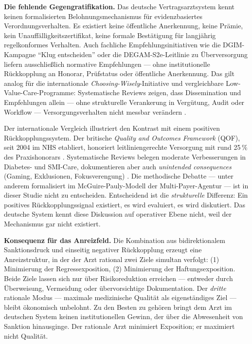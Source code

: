 \documentclass{umbruch-position}
\begin{document}
\textbf{Die fehlende Gegengratifikation.} Das deutsche Vertragsarztsystem kennt keinen formalisierten Belohnungsmechanismus für evidenzbasiertes Verordnungsverhalten. Es existiert keine öffentliche Anerkennung, keine Prämie, kein Unauffälligkeitszertifikat, keine formale Bestätigung für langjährig regelkonformes Verhalten. Auch fachliche Empfehlungsinitiativen wie die DGIM-Kampagne ``Klug entscheiden'' \cite{dgim_klug_entscheiden} oder die DEGAM-S2e-Leitlinie zu Überversorgung \cite{degam_s2e_ueberversorgung} liefern ausschließlich normative Empfehlungen --- ohne institutionelle Rückkopplung an Honorar, Prüfstatus oder öffentliche Anerkennung. Das gilt analog für die internationale \emph{Choosing-Wisely}-Initiative und vergleichbare Low-Value-Care-Programme: Systematische Reviews zeigen, dass Dissemination und Empfehlungen allein --- ohne strukturelle Verankerung in Vergütung, Audit oder Workflow --- Versorgungsverhalten nicht messbar verändern \cite{cliff2021cw,colla2017cw}.

Der internationale Vergleich illustriert den Kontrast mit einem positiven Rückkopplungssystem. Der britische \emph{Quality and Outcomes Framework} (QOF), seit 2004 im NHS etabliert, honoriert leitliniengerechte Versorgung mit rund 25\,\% des Praxishonorars \cite{doran2006qof,forbes2017qof}. Systematische Reviews belegen moderate Verbesserungen in Diabetes- und SMI-Care, dokumentieren aber auch \emph{unintended consequences} (Gaming, Exklusionen, Fokusverengung) \cite{roland2009p4p,vanherck2010p4p}. Die methodische Debatte --- unter anderem formalisiert im McGuire-Pauly-Modell der Multi-Payer-Agentur \cite{mcguirepauly1991} --- ist in dieser Studie nicht zu entscheiden. Entscheidend ist die \emph{strukturelle} Differenz: Ein positives Rückkopplungssignal existiert, es wird evaluiert, es wird diskutiert. Das deutsche System kennt diese Diskussion auf operativer Ebene nicht, weil der Mechanismus gar nicht existiert.

\textbf{Konsequenz für das Anreizfeld.} Die Kombination aus bidirektionalem Sanktionsdruck und einseitig negativer Rückkopplung erzeugt eine Anreizstruktur, in der der Arzt rational zwei Ziele simultan verfolgt: (1) Minimierung der Regressexposition, (2) Minimierung der Haftungsexposition. Beide Ziele lassen sich nur über Risikoreduktion erreichen --- entweder durch Überweisung, Vermeidung oder übervorsichtige Dokumentation. Der \emph{dritte} rationale Modus --- maximale medizinische Qualität als eigenständiges Ziel --- bleibt ökonomisch unbelohnt. Zu den Besten zu gehören bringt dem Arzt im deutschen System keinen institutionellen Gewinn, der über die Abwesenheit von Sanktion hinausginge. Der rationale Arzt minimiert Exposition; er maximiert nicht Qualität.
\end{document}
